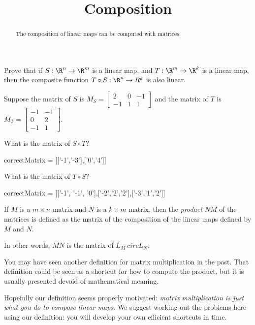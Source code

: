 \documentclass{ximera}
\title{Composition}
\begin{document}
\begin{abstract}
  The composition of linear maps can be computed with matrices.
\end{abstract}

Prove that if $S:\R^n \to \R^m$ is a linear map, and $T:\R^m \to \R^k$ is a linear map, then the composite function $T\circ S:\R^n \to R^k$ is also linear.
  
\begin{free-response}
\end{free-response}
	
\begin{question}
  Suppose the matrix of $S$ is $M_S = \begin{bmatrix}
2 & 0 & -1 \\
-1 & 1 & 1
\end{bmatrix}$ and the matrix of $T$ is $M_T = \begin{bmatrix}
-1 & -1 \\
0 & 2 \\
-1 & 1
\end{bmatrix}$.

\begin{solution}
  What is the matrix of $S \circ T$?

  \begin{matrix-answer}[name=M]
    correctMatrix = [['-1','-3'],['0','4']]
  \end{matrix-answer}
\end{solution}

\begin{solution}
  What is the matrix of $T \circ S$?

  \begin{matrix-answer}[name=M]
    correctMatrix = [['-1', '-1', '0'],['-2','2','2'],['-3','1','2']]
  \end{matrix-answer}
\end{solution}

\end{question}
	
\begin{definition}
  If $M$ is a $m\times n$ matrix and $N$ is a $k \times m$ matrix,
  then the \textit{product} $NM$ of the matrices is defined as the
  matrix of the composition of the linear maps defined by $M$ and $N$.

  In other words, $MN$ is the matrix of $L_M\ circ L_N$.
\end{definition}

\begin{warning}
  You may have seen another definition for matrix multiplication in
  the past.  That definition could be seen as a shortcut for how to
  compute the product, but it is usually presented devoid of
  mathematical meaning.

  Hopefully our definition seems properly motivated: \textit{matrix
    multiplication is just what you do to compose linear maps.} We
  suggest working out the problems here using our definition: you will
  develop your own efficient shortcuts in time.
\end{warning}
	
\end{document}
